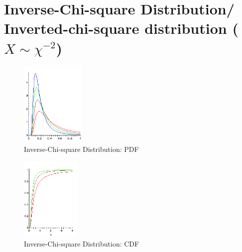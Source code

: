\chapter{Inverse-Chi-square Distribution/ Inverted-chi-square distribution ($X \sim \chi^{-2}$) \cite{wiki/Inverse-chi-squared_distribution}} \label{Inverse-Chi-square Distribution/ Inverted-chi-square distribution}


\begin{table}[H]
    \begin{minipage}{0.49\linewidth}
        \begin{figure}[H]
            \centering
            \includegraphics[width=\linewidth, height=4cm, keepaspectratio]{Pictures/distributions/Inverse_chi_squared_pdf.png}
            \caption{Inverse-Chi-square Distribution: PDF}
        \end{figure}
    \end{minipage}
    \hfill
    \begin{minipage}{0.49\linewidth}
        \begin{figure}[H]
            \centering
            \includegraphics[width=\linewidth, height=4cm, keepaspectratio]{Pictures/distributions/Inverse_chi_squared_cdf.png}
            \caption{Inverse-Chi-square Distribution: CDF}
        \end{figure}
    \end{minipage}
\end{table}


